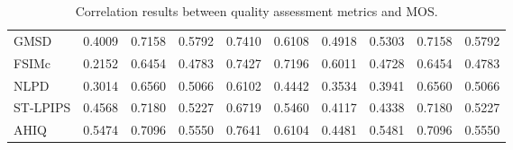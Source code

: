 \begin{table*}[ht]
\begin{tabularx}{\textwidth}{l|X@{}X@{}X|X@{}X@{}X|X@{}X@{}X}
GMSD&0.4009&0.7158&0.5792&0.7410&0.6108&0.4918&0.5303&0.7158&0.5792 \\
FSIMc&0.2152&0.6454&0.4783&0.7427&0.7196&0.6011&0.4728&0.6454&0.4783 \\
NLPD&0.3014&0.6560&0.5066&0.6102&0.4442&0.3534&0.3941&0.6560&0.5066 \\
ST-LPIPS&0.4568&0.7180&0.5227&0.6719&0.5460&0.4117&0.4338&0.7180&0.5227 \\
AHIQ&0.5474&0.7096&0.5550&0.7641&0.6104&0.4481&0.5481&0.7096&0.5550 \\
\hline \hline
\end{tabularx}
\caption{Correlation results between quality assessment metrics and MOS.}
\label{table:combined_mos_correlations}
\end{table*}
